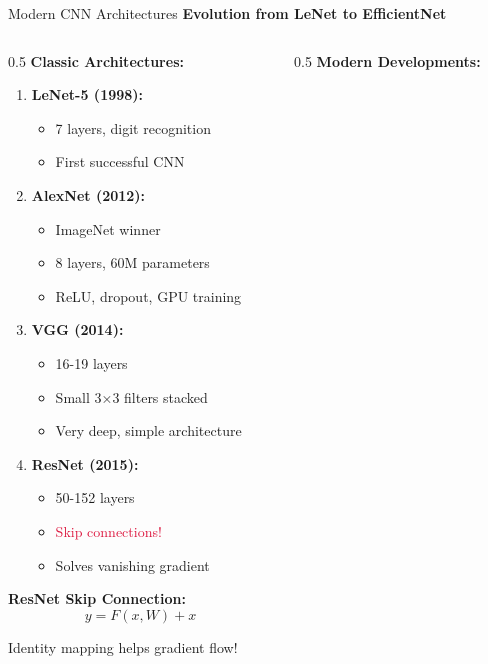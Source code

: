 \begin{frame}{Modern CNN Architectures}
\textbf{Evolution from LeNet to EfficientNet}

\begin{columns}
\begin{column}{0.5\textwidth}
\textbf{Classic Architectures:}

\begin{enumerate}
\item \textbf{LeNet-5 (1998):}
  \begin{itemize}
  \item 7 layers, digit recognition
  \item First successful CNN
  \end{itemize}

\item \textbf{AlexNet (2012):}
  \begin{itemize}
  \item ImageNet winner
  \item 8 layers, 60M parameters
  \item ReLU, dropout, GPU training
  \end{itemize}

\item \textbf{VGG (2014):}
  \begin{itemize}
  \item 16-19 layers
  \item Small 3×3 filters stacked
  \item Very deep, simple architecture
  \end{itemize}

\item \textbf{ResNet (2015):}
  \begin{itemize}
  \item 50-152 layers
  \item \textcolor{crimson}{Skip connections!}
  \item Solves vanishing gradient
  \end{itemize}
\end{enumerate}

\textbf{ResNet Skip Connection:}
\[
y = F(x, W) + x
\]

Identity mapping helps gradient flow!
\end{column}

\begin{column}{0.5\textwidth}
\textbf{Modern Developments:}


\end{column}
\end{columns}
\end{frame}
